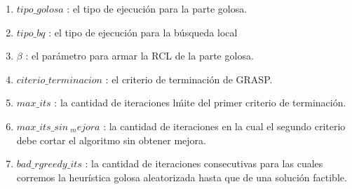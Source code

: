 \begin{enumerate}
\item $tipo\_golosa$ : el tipo de ejecuci\'on para la parte golosa.
\item $tipo\_bq$ : el tipo de ejecuci\'on para la b\'usqueda local
\item $\beta$ : el par\'ametro para armar la RCL de la parte golosa.
\item $citerio\_terminacion$ : el criterio de terminaci\'on de GRASP.
\item $max\_its$ : la cantidad de iteraciones l\'mite del primer criterio de terminaci\'on.
\item $max\_its\_sin\ _mejora$ : la cantidad de iteraciones en la cual el segundo criterio debe cortar el algoritmo sin obtener mejora.
\item $bad\_rgreedy\_its$ : la cantidad de iteraciones consecutivas para las cuales corremos la heur\'istica golosa aleatorizada hasta que de una soluci\'on factible.
\end{enumerate}

